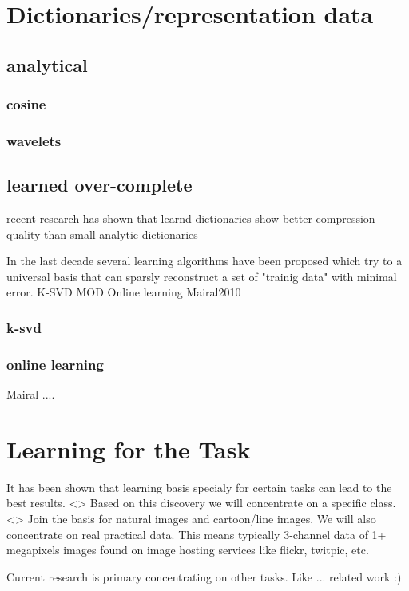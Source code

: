 \section{Dictionaries/representation data}
\subsection{analytical}
\subsubsection{cosine}
\subsubsection{wavelets}

\subsection{learned over-complete}
recent research has shown that learnd dictionaries show better compression quality than small analytic dictionaries \cite{Aharon2006} \cite{Chen1998} 


In the last decade several learning algorithms have been proposed which try to a universal basis that 
can sparsly reconstruct a set of "trainig data" with minimal error. 
K-SVD
MOD
Online learning
Mairal2010

\subsubsection{k-svd}
\subsubsection{online learning}
Mairal .... \cite{Mairal2010}

\section{Learning for the Task}
It has been shown that learning basis specialy for certain tasks can lead to the best results\cite{}.  <>
Based on this discovery we will concentrate on a specific class. <> Join the basis for natural images and cartoon/line images.
We will also concentrate on real practical data. This means typically 3-channel data of 1+ megapixels images found on image hosting services like flickr, twitpic, etc.

Current research is primary concentrating on other tasks. 
Like ... related work :)

